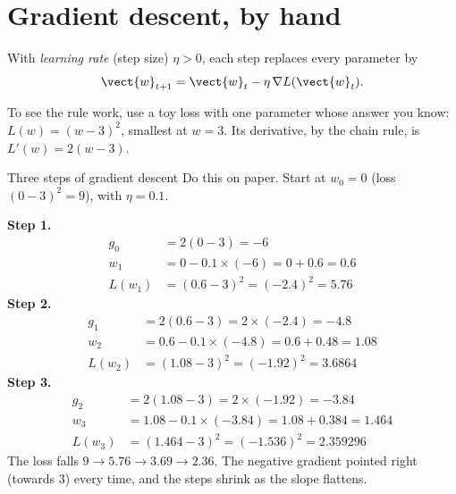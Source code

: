 \section{Gradient descent, by hand}\label{sec:trainloop:gd}

\begin{definition}
With \emph{learning rate} (step size) $\eta > 0$, each step replaces every parameter by
\begin{equation}\label{eq:trainloop:gd}
\vect{w}_{t+1} = \vect{w}_t - \eta\,\nabla L(\vect{w}_t).
\end{equation}
\end{definition}

To see the rule work, use a toy loss with one parameter whose answer you know: $L(w) = (w -
3)^2$, smallest at $w = 3$. Its derivative, by the chain rule, is $L'(w) = 2(w - 3)$.

\begin{worked}[label={we:trainloop:gd}]{Three steps of gradient descent}
Do this on paper. Start at $w_0 = 0$ (loss $(0 - 3)^2 = 9$), with $\eta = 0.1$.

\textbf{Step 1.}
\begin{align*}
g_0 &= 2(0 - 3) = -6\\
w_1 &= 0 - 0.1 \times (-6) = 0 + 0.6 = 0.6\\
L(w_1) &= (0.6 - 3)^2 = (-2.4)^2 = 5.76
\end{align*}
\textbf{Step 2.}
\begin{align*}
g_1 &= 2(0.6 - 3) = 2 \times (-2.4) = -4.8\\
w_2 &= 0.6 - 0.1 \times (-4.8) = 0.6 + 0.48 = 1.08\\
L(w_2) &= (1.08 - 3)^2 = (-1.92)^2 = 3.6864
\end{align*}
\textbf{Step 3.}
\begin{align*}
g_2 &= 2(1.08 - 3) = 2 \times (-1.92) = -3.84\\
w_3 &= 1.08 - 0.1 \times (-3.84) = 1.08 + 0.384 = 1.464\\
L(w_3) &= (1.464 - 3)^2 = (-1.536)^2 = 2.359296
\end{align*}
The loss falls $9 \to 5.76 \to 3.69 \to 2.36$. The negative gradient pointed right (towards 3)
every time, and the steps shrink as the slope flattens.
\end{worked}

